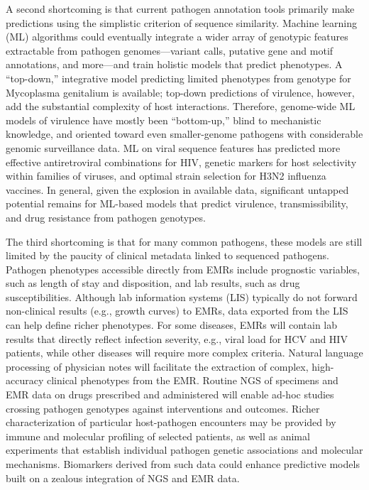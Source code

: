A second shortcoming is that current pathogen annotation tools primarily make predictions using the simplistic criterion of sequence similarity. Machine learning (ML) algorithms could eventually integrate a wider array of genotypic features extractable from pathogen genomes—variant calls, putative gene and motif annotations, and more—and train holistic models that predict phenotypes. A “top-down,” integrative model predicting limited phenotypes from genotype for Mycoplasma genitalium is available;\autocite{Karr2012} top-down predictions of virulence, however, add the substantial complexity of host interactions. Therefore, genome-wide ML models of virulence have mostly been “bottom-up,” blind to mechanistic knowledge, and oriented toward even smaller-genome pathogens with considerable genomic surveillance data. ML on viral sequence features has predicted more effective antiretroviral combinations for HIV,\autocite{Lengauer2006,Zazzi2012} genetic markers for host selectivity within families of viruses,\autocite{Raj2011a} and optimal strain selection for H3N2 influenza vaccines.\autocite{Luksza2014} In general, given the explosion in available data, significant untapped potential remains for ML-based models that predict virulence, transmissibility, and drug resistance from pathogen genotypes. 

The third shortcoming is that for many common pathogens, these models are still limited by the paucity of clinical metadata linked to sequenced pathogens. Pathogen phenotypes accessible directly from EMRs include prognostic variables, such as length of stay and disposition, and lab results, such as drug susceptibilities. Although lab information systems (LIS) typically do not forward non-clinical results (e.g., growth curves) to EMRs, data exported from the LIS can help define richer phenotypes. For some diseases, EMRs will contain lab results that directly reflect infection severity, e.g., viral load for HCV and HIV patients,\autocite{Norton2014} while other diseases will require more complex criteria.\autocite{DeLisle2013,Klompas2008,Silva2013} Natural language processing of physician notes will facilitate the extraction of complex, high-accuracy clinical phenotypes from the EMR.\autocite{Liao2015,Silva2013} Routine NGS of specimens and EMR data on drugs prescribed and administered will enable ad-hoc studies crossing pathogen genotypes against interventions and outcomes. Richer characterization of particular host-pathogen encounters may be provided by immune and molecular profiling of selected patients, as well as animal experiments that establish individual pathogen genetic associations and molecular mechanisms. Biomarkers derived from such data\autocite{Mejias2014,Querec2009} could enhance predictive models built on a zealous integration of NGS and EMR data.

